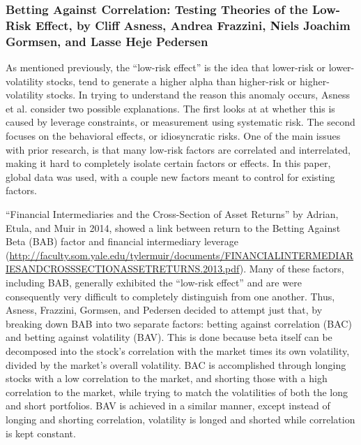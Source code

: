 \documentclass[12pt,twoside]{reedthesis}
\theoremstyle{definition}
\theoremstyle{definition}
\theoremstyle{definition}
\theoremstyle{remark}
\begin{document}
\subsubsection{Betting Against Correlation: Testing Theories of the
Low-Risk Effect, by Cliff Asness, Andrea Frazzini, Niels Joachim
Gormsen, and Lasse Heje
Pedersen}\label{betting-against-correlation-testing-theories-of-the-low-risk-effect-by-cliff-asness-andrea-frazzini-niels-joachim-gormsen-and-lasse-heje-pedersen}

As mentioned previously, the ``low-risk effect'' is the idea that
lower-risk or lower-volatility stocks, tend to generate a higher alpha
than higher-risk or higher-volatility stocks. In trying to understand
the reason this anomaly occurs, Asness et al. consider two possible
explanations. The first looks at at whether this is caused by leverage
constraints, or measurement using systematic risk. The second focuses on
the behavioral effects, or idiosyncratic risks. One of the main issues
with prior research, is that many low-risk factors are correlated and
interrelated, making it hard to completely isolate certain factors or
effects. In this paper, global data was used, with a couple new factors
meant to control for existing factors.

``Financial Intermediaries and the Cross-Section of Asset Returns'' by
Adrian, Etula, and Muir in 2014, showed a link between return to the
Betting Against Beta (BAB) factor and financial intermediary leverage
(\url{http://faculty.som.yale.edu/tylermuir/documents/FINANCIALINTERMEDIARIESANDCROSSSECTIONASSETRETURNS.2013.pdf}).
Many of these factors, including BAB, generally exhibited the ``low-risk
effect'' and are were consequently very difficult to completely
distinguish from one another. Thus, Asness, Frazzini, Gormsen, and
Pedersen decided to attempt just that, by breaking down BAB into two
separate factors: betting against correlation (BAC) and betting against
volatility (BAV). This is done because beta itself can be decomposed
into the stock's correlation with the market times its own volatility,
divided by the market's overall volatility. BAC is accomplished through
longing stocks with a low correlation to the market, and shorting those
with a high correlation to the market, while trying to match the
volatilities of both the long and short portfolios. BAV is achieved in a
similar manner, except instead of longing and shorting correlation,
volatility is longed and shorted while correlation is kept constant.
\end{document}
